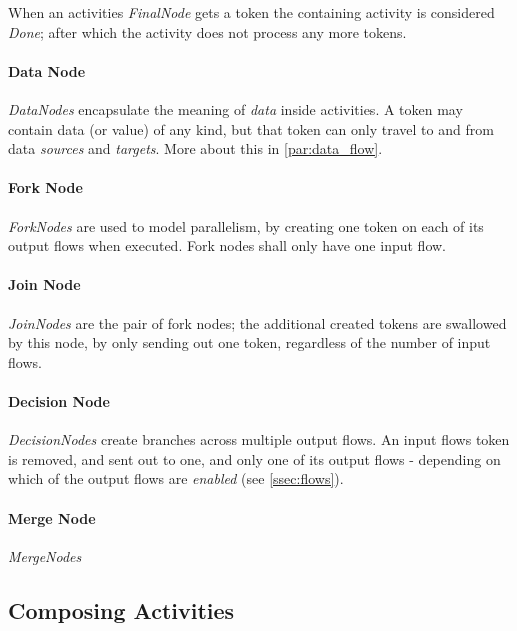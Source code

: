 When an activities \emph{FinalNode} gets a token the containing activity is considered \emph{Done}; after which the activity does not process any more tokens.

\paragraph{Data Node}

\emph{DataNodes} encapsulate the meaning of \emph{data} inside activities. A token may contain data (or value) of any kind, but that token can only travel to and from data \emph{sources} and \emph{targets}. More about this in \autoref{par:data_flow}.

\paragraph{Fork Node}

\emph{ForkNodes} are used to model parallelism, by creating one token on each of its output flows when executed. Fork nodes shall only have one input flow.

\paragraph{Join Node}

\emph{JoinNodes} are the pair of fork nodes; the additional created tokens are swallowed by this node, by only sending out one token, regardless of the number of input flows.

\paragraph{Decision Node}

\emph{DecisionNodes} create branches across multiple output flows. An input flows token is removed, and sent out to one, and only one of its output flows - depending on which of the output flows are \emph{enabled} (see \autoref{ssec:flows}).

\paragraph{Merge Node}

\emph{MergeNodes} 

\subsection{Composing Activities}

